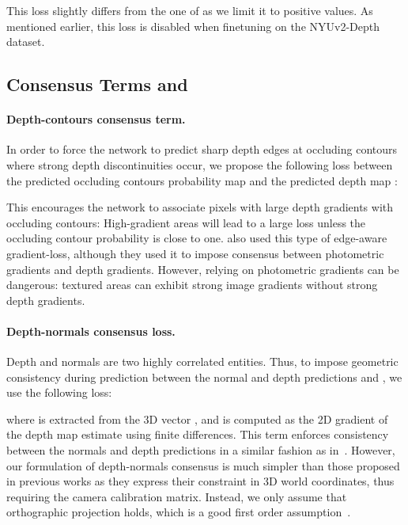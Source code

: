 \documentclass[10pt,twocolumn,letterpaper]{article}
\begin{document}
This loss  slightly differs from  the one of \cite{Eigen2015PredictingDS}  as we
limit it  to positive values. As  mentioned earlier, this loss  is disabled when
finetuning on the NYUv2-Depth dataset.

\subsection{Consensus Terms  and 
}\label{ssec:consensus_terms}

\paragraph{Depth-contours consensus term.}
In order to force the network to predict  sharp depth edges at  occluding 
contours where strong depth  discontinuities occur, we  propose the following 
loss  between the predicted occluding contours probability map   and the 
predicted depth map :

This encourages the network to associate  pixels with large depth gradients with
occluding contours:  High-gradient areas will  lead to  a large loss  unless the
occluding contour probability is close to one.
\cite{monodepth17,Heise2013PMHuber}   also   used   this  type   of   edge-aware
gradient-loss, although  they used  it to  impose consensus  between photometric
gradients and depth gradients. However, relying on 
photometric gradients can be dangerous: textured areas can exhibit strong image 
gradients without strong depth gradients.

\paragraph{Depth-normals consensus loss.}
\label{par:surface_consensus}

Depth and normals are two highly correlated entities. Thus, to impose 
geometric  consistency during prediction between the  normal and depth
predictions  and , we use the following loss:




where  is extracted from the
3D vector , and 
 is computed as the 2D 
gradient of the depth map estimate using finite differences. This term enforces 
consistency between the normals and depth predictions in a similar fashion as 
in~\cite{WangSurgeNIPS16, Yang2018lego, Fei2018GeoSupervisedVD}.
However, our formulation of depth-normals consensus is much simpler than those 
proposed in previous works as they express their constraint in 3D world 
coordinates, thus requiring the camera calibration matrix. Instead, we only 
assume that orthographic projection holds, which is a good first order 
assumption~\cite{Wu_LineIntegration88}.
\end{document}
